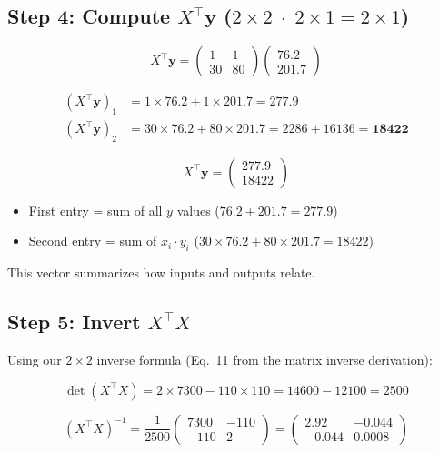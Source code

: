 \documentclass[11pt, a4paper]{article}
\newcommand{\gut}[1]{\begin{tcolorbox}[colback=lightyellow, colframe=orange!50, title=Gut feeling]#1\end{tcolorbox}}
\begin{document}
\subsection*{Step 4: Compute $X^\top \mathbf{y}$ \quad ($2\times 2 \;\cdot\; 2\times 1 = 2\times 1$)}

\begin{equation}
X^\top \mathbf{y} = \begin{pmatrix} 1 & 1 \\ 30 & 80 \end{pmatrix}
\begin{pmatrix} 76.2 \\ 201.7 \end{pmatrix}
\tag{N-5}
\end{equation}

\begin{align}
(X^\top \mathbf{y})_1 &= 1 \times 76.2 + 1 \times 201.7 = \mathbf{277.9} \tag{N-5a} \\
(X^\top \mathbf{y})_2 &= 30 \times 76.2 + 80 \times 201.7 = 2286 + 16136 = \mathbf{18422} \tag{N-5b}
\end{align}

\begin{equation}
X^\top \mathbf{y} = \begin{pmatrix} 277.9 \\ 18422 \end{pmatrix}
\tag{N-6}
\end{equation}

\gut{
\begin{itemize}
\item First entry = sum of all $y$ values ($76.2 + 201.7 = 277.9$)
\item Second entry = sum of $x_i \cdot y_i$ ($30 \times 76.2 + 80 \times 201.7 = 18422$)
\end{itemize}
This vector summarizes how inputs and outputs relate.
}


\subsection*{Step 5: Invert $X^\top X$}

Using our $2\times 2$ inverse formula (Eq.~11 from the matrix inverse derivation):

\begin{equation}
\det(X^\top X) = 2 \times 7300 - 110 \times 110 = 14600 - 12100 = 2500
\tag{N-7}
\end{equation}

\begin{equation}
(X^\top X)^{-1} = \frac{1}{2500} \begin{pmatrix} 7300 & -110 \\ -110 & 2 \end{pmatrix}
= \begin{pmatrix} 2.92 & -0.044 \\ -0.044 & 0.0008 \end{pmatrix}
\tag{N-8}
\end{equation}
\end{document}
